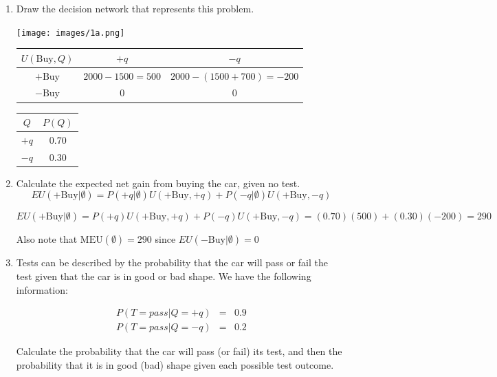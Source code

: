 \documentclass[12pt]{article}
\begin{document}
\begin{enumerate}

\item  Draw the decision network that represents this problem.
\begin{center}
  \texttt{[image: images/1a.png]}
\end{center}

\begin{center}
  \begin{tabular}{|c|c|c|}
    \hline
    $U(\text{Buy}, Q)$ & $+q$ & $-q$ \\
    \hline
    $+\text{Buy}$ & $2000 - 1500 = 500$ & $2000 - (1500+700) = -200$ \\
    \hline
    $-\text{Buy}$ & $0$ & $0$ \\
    \hline
  \end{tabular}
\end{center}

\begin{center}
  \begin{tabular}{|c|c|}
    \hline
    $Q$ & $P(Q)$ \\
    \hline
    $+q$ & 0.70 \\
    \hline
    $-q$ & 0.30\\
    \hline
  \end{tabular}
\end{center}

\item  Calculate the expected net gain from buying the car, given no test.
\[
  EU(+\text{Buy}|\emptyset) = P(+q|\emptyset) U(+\text{Buy},+q) + P(-q|\emptyset) U(+\text{Buy},-q) 
\]

\[
  EU(+\text{Buy}|\emptyset) = P(+q) U(+\text{Buy},+q) + P(-q) U(+\text{Buy},-q) = (0.70)(500) + (0.30)(-200) = 290
\]

Also note that $\text{MEU}(\emptyset) = 290$ since $EU(-\text{Buy}|\emptyset) = 0$

\item Tests can be described by the probability that the car will pass
  or fail the test given that the car is in good or bad shape. We have
  the following information:

\begin{eqnarray*}
P(T = pass | Q = +q) &=&  0.9 \\
P(T = pass | Q = -q) &=&  0.2
\end{eqnarray*}

Calculate the probability that the car will pass (or fail) its test,
and then the probability that it is in good (bad) shape given each
possible test outcome.


\end{enumerate}
\end{document}
